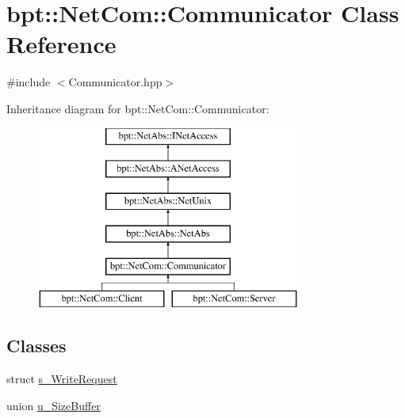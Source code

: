\hypertarget{classbpt_1_1_net_com_1_1_communicator}{\section{bpt\-:\-:Net\-Com\-:\-:Communicator Class Reference}
\label{classbpt_1_1_net_com_1_1_communicator}
}


{\ttfamily \#include $<$Communicator.\-hpp$>$}

Inheritance diagram for bpt\-:\-:Net\-Com\-:\-:Communicator\-:\begin{figure}[H]
\begin{center}
\leavevmode
\includegraphics[height=6.000000cm]{classbpt_1_1_net_com_1_1_communicator}
\end{center}
\end{figure}
\subsection*{Classes}
\begin{DoxyCompactItemize}
\item 
struct \hyperlink{structbpt_1_1_net_com_1_1_communicator_1_1s___write_request}{s\-\_\-\-Write\-Request}
\item 
union \hyperlink{unionbpt_1_1_net_com_1_1_communicator_1_1u___size_buffer}{u\-\_\-\-Size\-Buffer}
\end{DoxyCompactItemize}
